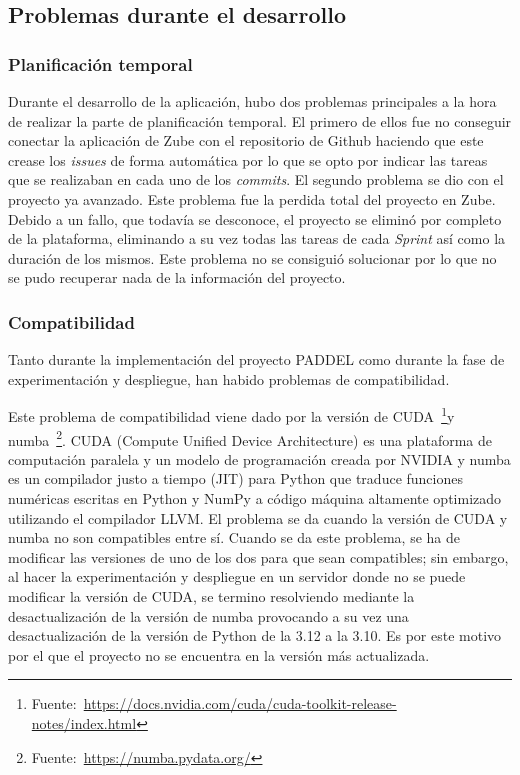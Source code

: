 \subsection{Problemas durante el desarrollo}

\subsubsection{Planificación temporal}

Durante el desarrollo de la aplicación, hubo dos problemas principales a la hora de realizar la parte de planificación temporal. El primero de ellos fue no conseguir conectar la aplicación de Zube con el repositorio de Github haciendo que este crease los \textit{issues} de forma automática por lo que se opto por indicar las tareas que se realizaban en cada uno de los \textit{commits}. El segundo problema se dio con el proyecto ya avanzado. Este problema fue la perdida total del proyecto en Zube. Debido a un fallo, que todavía se desconoce, el proyecto se eliminó por completo de la plataforma, eliminando a su vez todas las tareas de cada \textit{Sprint} así como la duración de los mismos. Este problema no se consiguió solucionar por lo que no se pudo recuperar nada de la información del proyecto.

\subsubsection{Compatibilidad}

Tanto durante la implementación del proyecto PADDEL como durante la fase de experimentación y despliegue, han habido problemas de compatibilidad.

Este problema de compatibilidad viene dado por la versión de CUDA~\footnote{Fuente:~\url{https://docs.nvidia.com/cuda/cuda-toolkit-release-notes/index.html}}y numba~\footnote{Fuente:~\url{https://numba.pydata.org/}}. CUDA (Compute Unified Device Architecture) es una plataforma de computación paralela y un modelo de programación creada por NVIDIA y numba es un compilador justo a tiempo (JIT) para Python que traduce funciones numéricas escritas en Python y NumPy a código máquina altamente optimizado utilizando el compilador LLVM. El problema se da cuando la versión de CUDA y numba no son compatibles entre sí. Cuando se da este problema, se ha de modificar las versiones de uno de los dos para que sean compatibles; sin embargo, al hacer la experimentación y despliegue en un servidor donde no se puede modificar la versión de CUDA, se termino resolviendo mediante la desactualización de la versión de numba provocando a su vez una desactualización de la versión de Python de la 3.12 a la 3.10. Es por este motivo por el que el proyecto no se encuentra en la versión más actualizada.

